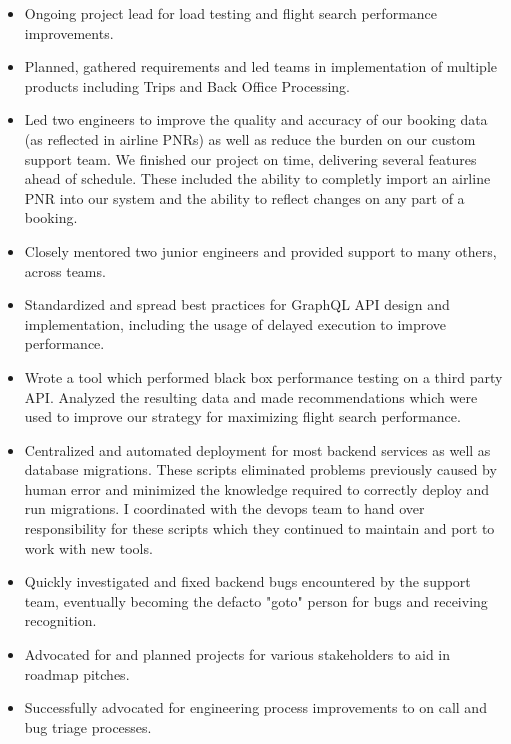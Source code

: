 \documentclass[10pt,letterpaper]{altacv}
\begin{document}
\begin{itemize}
\item Ongoing project lead for load testing and flight search
  performance improvements.
\item Planned, gathered requirements and led teams in implementation
  of multiple products including Trips and Back Office Processing.
\item Led two engineers to improve the quality and accuracy of our
  booking data (as reflected in airline PNRs) as well as reduce the
  burden on our custom support team. We finished our project on time,
  delivering several features ahead of schedule. These included the
  ability to completly import an airline PNR into our system and the
  ability to reflect changes on any part of a booking.
\item Closely mentored two junior engineers and provided support to
  many others, across teams.
\item Standardized and spread best practices for GraphQL API
  design and implementation, including the usage of delayed execution
  to improve performance.
\item Wrote a tool which performed black box performance testing on a
  third party API. Analyzed the resulting data and made
  recommendations which were used to improve our strategy for
  maximizing flight search performance.
\item Centralized and automated deployment for most backend services
  as well as database migrations. These scripts eliminated problems
  previously caused by human error and minimized the knowledge
  required to correctly deploy and run migrations. I coordinated with
  the devops team to hand over responsibility for these scripts which
  they continued to maintain and port to work with new tools.
\item Quickly investigated and fixed backend bugs encountered by the
  support team, eventually becoming the defacto "goto" person for
  bugs and receiving recognition.
\item Advocated for and planned projects for various stakeholders to
  aid in roadmap pitches.
\item Successfully advocated for engineering process improvements to
  on call and bug triage processes.
\end{itemize}

\divider
\end{document}
